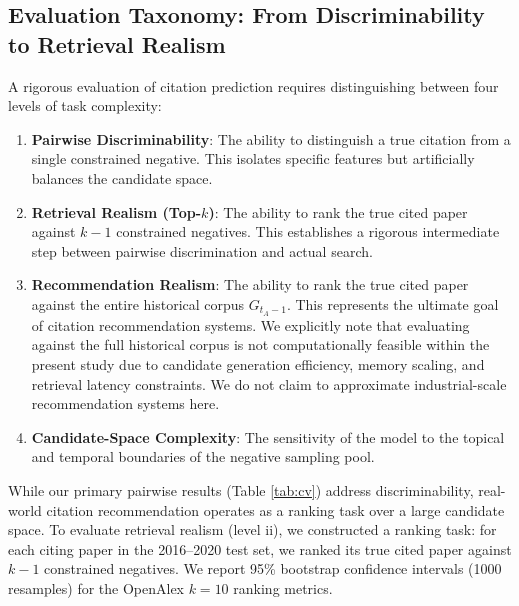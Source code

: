 \documentclass[11pt,a4paper]{article}
\begin{document}
\subsection{Evaluation Taxonomy: From Discriminability to Retrieval Realism}
A rigorous evaluation of citation prediction requires distinguishing between four levels of task complexity:
\begin{enumerate}
    \item \textbf{Pairwise Discriminability}: The ability to distinguish a true citation from a single constrained negative. This isolates specific features but artificially balances the candidate space.
    \item \textbf{Retrieval Realism (Top-$k$)}: The ability to rank the true cited paper against $k-1$ constrained negatives. This establishes a rigorous intermediate step between pairwise discrimination and actual search.
    \item \textbf{Recommendation Realism}: The ability to rank the true cited paper against the entire historical corpus $G_{t_A-1}$. This represents the ultimate goal of citation recommendation systems. We explicitly note that evaluating against the full historical corpus is not computationally feasible within the present study due to candidate generation efficiency, memory scaling, and retrieval latency constraints. We do not claim to approximate industrial-scale recommendation systems here.
    \item \textbf{Candidate-Space Complexity}: The sensitivity of the model to the topical and temporal boundaries of the negative sampling pool.
\end{enumerate}

While our primary pairwise results (Table \ref{tab:cv}) address discriminability, real-world citation recommendation operates as a ranking task over a large candidate space. To evaluate retrieval realism (level ii), we constructed a ranking task: for each citing paper in the 2016--2020 test set, we ranked its true cited paper against $k-1$ constrained negatives. We report 95\% bootstrap confidence intervals (1000 resamples) for the OpenAlex $k=10$ ranking metrics.
\end{document}
